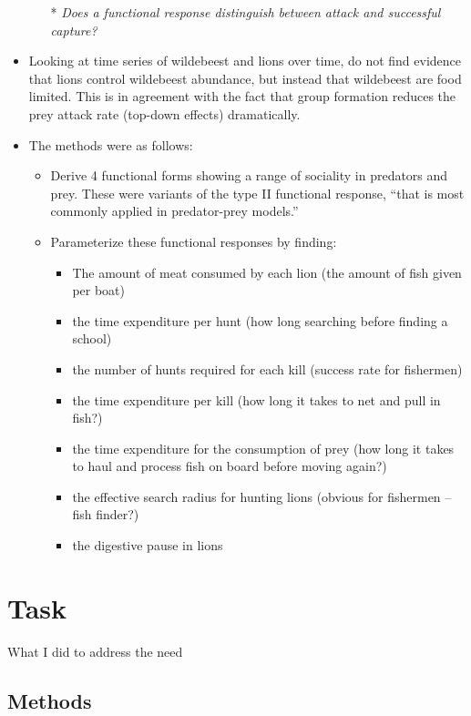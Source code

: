 \documentclass[a4paper,10pt]{report}
\begin{document}
\begin{itemize}
\begin{itemize}
\item[*]\textit{Does a functional response distinguish between attack and successful capture?}
\end{itemize}
\item Looking at time series of wildebeest and lions over time, do not find evidence that lions control wildebeest abundance, but instead that wildebeest are food limited. This is in agreement with the fact that group formation reduces the prey attack rate (top-down effects) dramatically.
\item The methods were as follows:
\begin{itemize}
\item Derive 4 functional forms showing a range of sociality in predators and prey. These were variants of the type II functional response, ``that is most commonly applied in predator-prey models.''
\item Parameterize these functional responses by finding:
\begin{itemize}
\item The amount of meat consumed by each lion (the amount of fish given per boat)
\item the time expenditure per hunt (how long searching before finding a school)
\item the number of hunts required for each kill (success rate for fishermen)
\item the time expenditure per kill (how long it takes to net and pull in fish?)
\item the time expenditure for the consumption of prey (how long it takes to haul and process fish on board before moving again?)
\item the effective search radius for hunting lions (obvious for fishermen -- fish finder?)
\item the digestive pause in lions
\end{itemize}
\end{itemize}
\end{itemize}


\chapter{Task}
What I did to address the need
\section{Methods}

\end{document}
